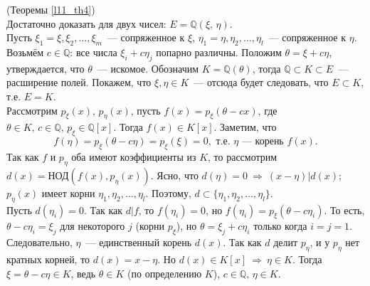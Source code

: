 \begin{pf} (Теоремы \ref{l11_th4})\\
	Достаточно доказать для двух чисел: $E=\mathbb{Q}(\xi,\,\eta)$.\\
	Пусть $\xi_1 = \xi, \xi_2,\dots,\xi_m$ — сопряженное к $\xi$, $\eta_1 = \eta, \eta_2,\dots,\eta_l$ — сопряженное к $\eta$.	Возьмём $c \in \mathbb{Q}$: все числа $\xi_i + c\eta_j$ попарно различны. Положим $\theta = \xi + c\eta$, утверждается, что $\theta$ — искомое. Обозначим $K = \mathbb{Q}(\theta)$, тогда $\mathbb{Q} \subset K \subset E$ — расширение полей. Покажем, что $\xi, \eta \in K$ — отсюда будет следовать, что $E \subset K$, т.е. $E=K$.\\
	Рассмотрим $p_\xi(x),\,p_\eta(x)$, пусть $f(x) = p_\xi(\theta - cx)$, где $\theta \in K, \, c \in \mathbb{Q}, \, p_\xi \in \mathbb{Q}[x]$. Тогда $f(x) \in K[x]$. Заметим, что
	$$f(\eta) = p_\xi(\theta - c\eta) = p_\xi(\xi) =0, \text{ т.е. } \eta \text{ — корень } f(x).$$
	Так как $f$ и $p_\eta$ оба имеют коэффициенты из $K$, то рассмотрим $d(x) = \text{НОД}(f(x), p_\eta(x))$. Ясно, что $d(\eta) = 0 \ \Rightarrow \ (x-\eta) \vert d(x)$; $p_\eta(x)$ имеет корни $\eta_1, \eta_2, \dots, \eta_l$. Поэтому, $d \subset \{ \eta_1, \eta_2, \dots, \eta_l \}$.\\
	Пусть $d(\eta_i)=0$. Так как $d \vert f$, то $f(\eta_i)=0$, но $f(\eta_i) = p_\xi(\theta - c\eta_i)$. То есть, $\theta - c\eta_i = \xi_j$ для некоторого $j$ (корни $p_\xi$), но $\theta = \xi_j + c\eta_i$ только когда $i=j=1$. Следовательно, $\eta$ — единственный корень $d(x)$. Так как $d$ делит $p_\eta$, и у $p_\eta$ нет кратных корней, то $d(x) = x - \eta$. Но $d(x) \in K[x] \ \Rightarrow \ \eta \in K$. Тогда $\xi = \theta - c\eta \in K$, ведь $\theta \in K$ (по определению $K$), $c \in \mathbb{Q}, \, \eta \in K$.
\end{pf}


